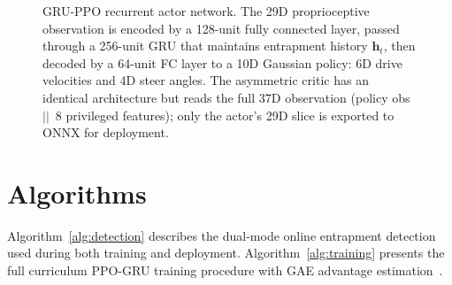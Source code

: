 \documentclass[conference]{IEEEtran}
\begin{document}
\begin{figure}[t]
{%
  }
  \caption{GRU-PPO recurrent actor network. The 29D proprioceptive observation is
    encoded by a 128-unit fully connected layer, passed through a 256-unit GRU that
    maintains entrapment history $\mathbf{h}_t$, then decoded by a 64-unit FC layer
    to a 10D Gaussian policy: 6D drive velocities and 4D steer angles. The
    asymmetric critic has an identical architecture but reads the full 37D
    observation (policy obs~$||$~8 privileged features); only the actor's 29D slice
    is exported to ONNX for deployment.}
  \label{fig:policy_arch}
\end{figure}

\section{Algorithms}
\label{sec:algorithms}

Algorithm~\ref{alg:detection} describes the dual-mode online entrapment detection
used during both training and deployment. Algorithm~\ref{alg:training} presents the full curriculum PPO-GRU training
procedure with GAE advantage estimation~\cite{schulman2015gae}.
\end{document}
